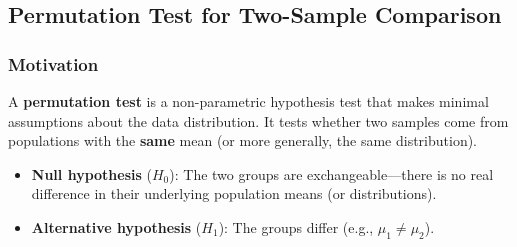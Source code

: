 \documentclass[10pt]{extarticle}
\begin{document}
\bigskip

\subsection{Permutation Test for Two-Sample Comparison}

\subsubsection{Motivation}
A \textbf{permutation test} is a non-parametric hypothesis test that makes minimal assumptions about the data distribution. It tests whether two samples come from populations with the \textbf{same} mean (or more generally, the same distribution).
\begin{itemize}
    \item \textbf{Null hypothesis} ($H_0$): The two groups are exchangeable---there is no real difference in their underlying population means (or distributions).
    \item \textbf{Alternative hypothesis} ($H_1$): The groups differ (e.g., $\mu_1 \neq \mu_2$).
\end{itemize}
\end{document}
